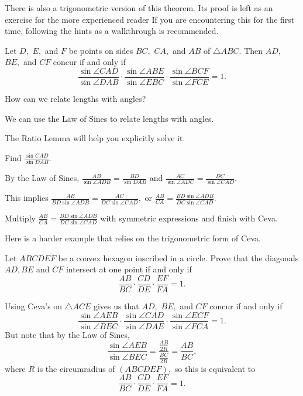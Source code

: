 There is also a trigonometric version of this theorem. Its proof is left as an exercise for the more experienced reader If you are encountering this for the first time, following the hints as a walkthrough is recommended.
\begin{theo}
Let $D,$ $E,$ and $F$ be points on sides $BC,$ $CA,$ and $AB$ of $\triangle ABC.$ Then $AD,$ $BE,$ and $CF$ concur if and only if
\[\frac{\sin\angle CAD}{\sin\angle DAB}\cdot \frac{\sin\angle ABE}{\sin\angle EBC}\cdot \frac{\sin\angle BCF}{\sin\angle FCE}=1.\]
\begin{hint}
\begin{addhint}
{How can we relate lengths with angles?}
\end{addhint}
\begin{addhint}
{We can use the Law of Sines to relate lengths with angles.}
\end{addhint}
\begin{addhint}
{The Ratio Lemma will help you explicitly solve it.}
\end{addhint}
\begin{addhint}
{Find $\frac{\sin CAD}{\sin DAB}.$}
\end{addhint}
\begin{addhint}
{By the Law of Sines, $\frac{AB}{\sin \angle ADB}=\frac{BD}{\sin DAB}$ and $\frac{AC}{\sin \angle ADC}=\frac{DC}{\sin \angle CAD}.$}
\end{addhint}
\begin{addhint}
{This implies $\frac{AB}{BD \sin \angle ADB}=\frac{AC}{DC\sin \angle CAD},$ or $\frac{AB}{CA}=\frac{BD\sin \angle ADB}{DC\sin \angle CAD}.$}
\end{addhint}
\begin{addhint}
{Multiply $\frac{AB}{CA}=\frac{BD\sin \angle ADB}{DC\sin \angle CAD}$ with symmetric expressions and finish with Ceva.}
\end{addhint}
\end{hint}
\end{theo}

Here is a harder example that relies on the trigonometric form of Ceva.

\begin{exam}
Let $ABCDEF$ be a convex hexagon inscribed in a circle. Prove that the diagonals $AD, BE$ and $CF$ intersect at one point if and only if \[\frac{AB}{BC} \cdot \frac{CD}{DE}\cdot \frac{EF}{FA}=1.\]
\end{exam}

\begin{sol}
Using Ceva's on $\triangle ACE$ gives us that $AD,$ $BE,$ and $CF$ concur if and only if
\[\frac{\sin\angle AEB}{\sin\angle BEC}\cdot \frac{\sin\angle CAD}{\sin\angle DAE}\cdot \frac{\sin\angle ECF}{\sin\angle FCA}=1.\]
But note that by the Law of Sines,
\[\frac{\sin\angle AEB}{\sin\angle BEC}=\frac{\frac{AB}{2R}}{\frac{BC}{2R}}=\frac{AB}{BC},\]
where $R$ is the circumradius of $(ABCDEF),$ so this is equivalent to
\[\frac{AB}{BC}\cdot \frac{CD}{DE}\cdot \frac{EF}{FA} =1.\]
\end{sol}


